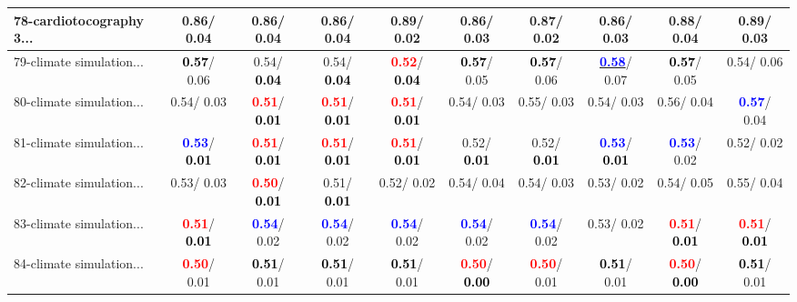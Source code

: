 \begin{table}[h]
\begin{center}
{\begin{tabular}{lc|c|c|c|c|c|c|c|c}
78-cardiotocography 3... &   0.86/  0.04 &   0.86/  0.04 &   0.86/  0.04 &   0.89/  0.02 &   0.86/  0.03 &   0.87/  0.02 &   0.86/  0.03 &   0.88/  0.04 &   0.89/  0.03 \\ \hline
79-climate simulation... & \textcolor{black}{\textbf{  0.57}}/  0.06 &   0.54/\textcolor{black}{\textbf{  0.04}} &   0.54/\textcolor{black}{\textbf{  0.04}} & \textcolor{red}{\textbf{  0.52}}/\textcolor{black}{\textbf{  0.04}} & \textcolor{black}{\textbf{  0.57}}/  0.05 & \textcolor{black}{\textbf{  0.57}}/  0.06 & \underline{\textcolor{blue}{\textbf{  0.58}}}/  0.07 & \textcolor{black}{\textbf{  0.57}}/  0.05 &   0.54/  0.06 \\
80-climate simulation... &   0.54/  0.03 & \textcolor{red}{\textbf{  0.51}}/\textcolor{black}{\textbf{  0.01}} & \textcolor{red}{\textbf{  0.51}}/\textcolor{black}{\textbf{  0.01}} & \textcolor{red}{\textbf{  0.51}}/\textcolor{black}{\textbf{  0.01}} &   0.54/  0.03 &   0.55/  0.03 &   0.54/  0.03 &   0.56/  0.04 & \textcolor{blue}{\textbf{  0.57}}/  0.04 \\
81-climate simulation... & \textcolor{blue}{\textbf{  0.53}}/\textcolor{black}{\textbf{  0.01}} & \textcolor{red}{\textbf{  0.51}}/\textcolor{black}{\textbf{  0.01}} & \textcolor{red}{\textbf{  0.51}}/\textcolor{black}{\textbf{  0.01}} & \textcolor{red}{\textbf{  0.51}}/\textcolor{black}{\textbf{  0.01}} &   0.52/\textcolor{black}{\textbf{  0.01}} &   0.52/\textcolor{black}{\textbf{  0.01}} & \textcolor{blue}{\textbf{  0.53}}/\textcolor{black}{\textbf{  0.01}} & \textcolor{blue}{\textbf{  0.53}}/  0.02 &   0.52/  0.02 \\
82-climate simulation... &   0.53/  0.03 & \textcolor{red}{\textbf{  0.50}}/\textcolor{black}{\textbf{  0.01}} &   0.51/\textcolor{black}{\textbf{  0.01}} &   0.52/  0.02 &   0.54/  0.04 &   0.54/  0.03 &   0.53/  0.02 &   0.54/  0.05 &   0.55/  0.04 \\
83-climate simulation... & \textcolor{red}{\textbf{  0.51}}/\textcolor{black}{\textbf{  0.01}} & \textcolor{blue}{\textbf{  0.54}}/  0.02 & \textcolor{blue}{\textbf{  0.54}}/  0.02 & \textcolor{blue}{\textbf{  0.54}}/  0.02 & \textcolor{blue}{\textbf{  0.54}}/  0.02 & \textcolor{blue}{\textbf{  0.54}}/  0.02 &   0.53/  0.02 & \textcolor{red}{\textbf{  0.51}}/\textcolor{black}{\textbf{  0.01}} & \textcolor{red}{\textbf{  0.51}}/\textcolor{black}{\textbf{  0.01}} \\
84-climate simulation... & \textcolor{red}{\textbf{  0.50}}/  0.01 & \textcolor{black}{\textbf{  0.51}}/  0.01 & \textcolor{black}{\textbf{  0.51}}/  0.01 & \textcolor{black}{\textbf{  0.51}}/  0.01 & \textcolor{red}{\textbf{  0.50}}/\textcolor{black}{\textbf{  0.00}} & \textcolor{red}{\textbf{  0.50}}/  0.01 & \textcolor{black}{\textbf{  0.51}}/  0.01 & \textcolor{red}{\textbf{  0.50}}/\textcolor{black}{\textbf{  0.00}} & \textcolor{black}{\textbf{  0.51}}/  0.01 \\

\end{tabular}}
\end{center}
\end{table}
